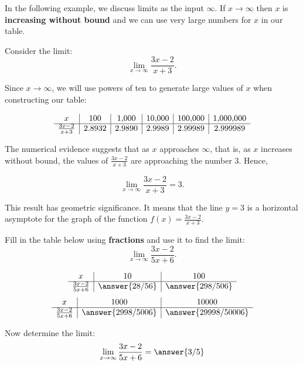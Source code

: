 \documentclass[handout]{ximera}
\begin{document}
In the following example, we discuss limits as the input $\infty$.
If $x \to \infty$ then $x$ is \textbf{increasing without bound} and we can use very large numbers for $x$ in our table.

\begin{example}[example 6]
Consider the limit:
\[\lim_{x \to \infty} \frac{3x -2}{x + 3}. \]

Since $x \to \infty$, we will use powers of ten to generate large values of $x$ when constructing 
our table: 

\[
\begin{array}{ c | c | c | c | c|c}
  x & 100 & 1{,}000 & 10{,}000 & 100{,}000 & 1{,}000{,}000\\ 
	\hline
	 \frac{3x-2}{x+3} & 2.8932 & 2.9890 & 2.9989 & 2.99989 & 2.999989
	\end{array}
\] 

The numerical evidence suggests that as $x$ approaches $\infty$, that is, 
as $x$ increases without bound, the values of $\frac{3x -2}{x +3}$ are approaching the number $3$. Hence,



\[\lim_{x \to \infty} \frac{3x -2}{x +3} = 3. \]

This result has geometric significance.  It means that the line $y = 3$ is a horizontal 
asymptote for the graph of the function $f(x) = \frac{3x -2}{x +3}.$
\end{example}


\begin{problem}[problem 6]
Fill in the table below using \textbf{fractions} and use it to find the limit:
\[\lim_{x \to \infty} \frac{3x-2}{5x+6}.\]

\begin{center}
\[
\begin{array}{ c | c | c }
  x & 10 & 100   \\ 
	\hline 
	 \frac{3x-2}{5x+6} & \answer{28/56} & \answer{298/506} 
\end{array}
\]
\[
\begin{array}{ c | c | c  }
  x  & 1000 & 10000 \\ 
	\hline 
	 \frac{3x-2}{5x+6}  & \answer{2998/5006} & \answer{29998/50006}
\end{array}
\]
\end{center}
Now determine the limit:
\[
\lim_{x \to \infty} \frac{3x-2}{5x+6} = \answer{3/5}
\]
\end{problem}
\end{document}
